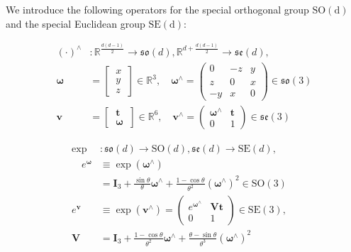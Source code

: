 \documentclass[a4paper,fleqn,10pt,twocolumn]{SICE_ISCS}
\begin{document}
We introduce the following operators for the special orthogonal group $\mathrm{SO(d)}$ and the special Euclidean group $\mathrm{SE(d)}$:

\begin{equation}
\begin{aligned}
(\cdot)^{\wedge}&: {{\mathbb{R}}}^{\frac{d(d-1)}{2}} \rightarrow  {\mathfrak{so}}(d), {{\mathbb{R}}}^{d+\frac{d(d-1)}{2}} \rightarrow  {\mathfrak{se}}(d),\\
{\boldsymbol{\omega}}&=\begin{bmatrix}
    \:x\: \\
    \:y\: \\
    \:z\: 
\end{bmatrix}\in{{\mathbb{R}}}^3,
\quad {\boldsymbol{\omega}}^{\wedge}=\begin{pmatrix}
    0&-z&y \\
    z&0&x \\
    -y&x&0 
\end{pmatrix}\in {\mathfrak{so}}(3)\\
{\mathbf{v}}&=\begin{bmatrix}
    \:{\mathbf{t}}\: \\
    \:{\boldsymbol{\omega}}\: 
\end{bmatrix}\in{{\mathbb{R}}}^6,\quad {\mathbf{v}}^\wedge=\begin{pmatrix}
    {{\boldsymbol{\omega}}^\wedge}& {\mathbf{t}}\\
    0&1
\end{pmatrix}\in {\mathfrak{se}}(3)
\end{aligned}
\end{equation}

\begin{equation}
\begin{aligned}
\exp&:  {\mathfrak{so}}(d) \rightarrow  \text{SO}(d),{\mathfrak{se}}(d) \rightarrow  \text{SE}(d),\\
\quad e^{{\boldsymbol{\omega}}} &\equiv \exp({{\boldsymbol{\omega}}}^\wedge) \\
&= {\mathbf{I}}_3 + \frac{\sin \theta}{\theta } {{\boldsymbol{\omega}}}^\wedge+\frac{1-\cos \theta }{\theta^2}({{\boldsymbol{\omega}}}^\wedge)^2 \in \text{SO}(3)\\
e^{{\mathbf{v}}}&\equiv \exp({{\mathbf{v}}^\wedge}) = 
\begin{pmatrix}
    e^{{{\boldsymbol{\omega}}}^\wedge}& {\mathbf{V}}{\mathbf{t}}\\
    0&1
\end{pmatrix}\in\text{SE}(3),\quad \\
{\mathbf{V}}&={\mathbf{I}}_3+\frac{1-\cos\theta}{\theta^2}{{\boldsymbol{\omega}}}^\wedge +\frac{\theta-\sin \theta}{\theta^3}({{\boldsymbol{\omega}}}^\wedge)^2
\end{aligned}
\end{equation}
\end{document}
